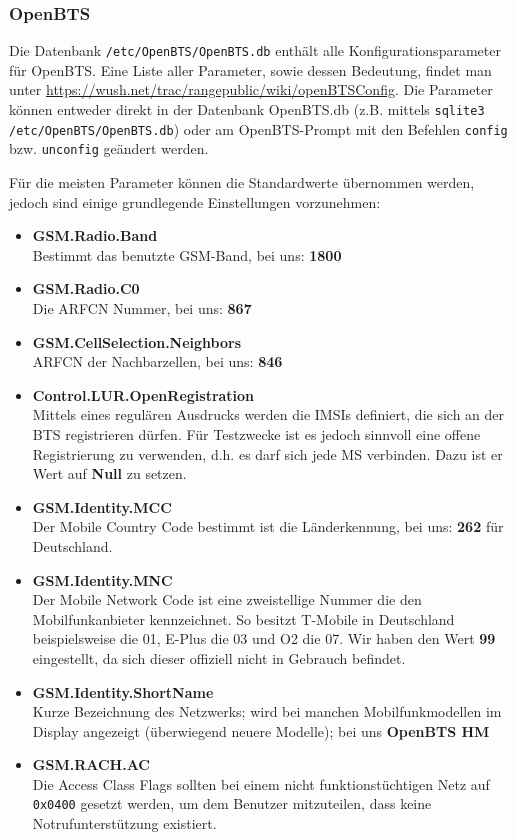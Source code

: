 \subsubsection{OpenBTS}
Die Datenbank \verb|/etc/OpenBTS/OpenBTS.db| enthält alle Konfigurationsparameter für OpenBTS. Eine Liste aller Parameter, sowie dessen Bedeutung, findet man unter \url{https://wush.net/trac/rangepublic/wiki/openBTSConfig}.
Die Parameter können entweder direkt in der Datenbank OpenBTS.db (z.B. mittels \verb|sqlite3 /etc/OpenBTS/OpenBTS.db|) oder am OpenBTS-Prompt mit den Befehlen \verb|config| bzw. \verb|unconfig| geändert werden.

Für die meisten Parameter können die Standardwerte übernommen werden, jedoch sind einige grundlegende Einstellungen vorzunehmen:

\begin{itemize}
  \item \textbf{GSM.Radio.Band}\\
  Bestimmt das benutzte GSM-Band, bei uns: \textbf{1800}
  \item \textbf{GSM.Radio.C0}\\
  Die ARFCN Nummer, bei uns: \textbf{867}
  \item \textbf{GSM.CellSelection.Neighbors}\\
  ARFCN der Nachbarzellen, bei uns: \textbf{846}
  \item \textbf{Control.LUR.OpenRegistration}\\
  Mittels eines regulären Ausdrucks werden die IMSIs definiert, die sich an der BTS registrieren dürfen. Für Testzwecke ist es jedoch sinnvoll eine offene Registrierung zu verwenden, d.h. es darf sich jede MS verbinden. Dazu ist er Wert auf \textbf{Null} zu setzen.
  \item \textbf{GSM.Identity.MCC}\\
  Der Mobile Country Code bestimmt ist die Länderkennung, bei uns: \textbf{262} für Deutschland.
  \item \textbf{GSM.Identity.MNC}\\
  Der Mobile Network Code ist eine zweistellige Nummer die den Mobilfunkanbieter kennzeichnet. So besitzt T-Mobile in Deutschland beispielsweise die 01, E-Plus die 03 und O2 die 07. Wir haben den Wert \textbf{99} eingestellt, da sich dieser offiziell nicht in Gebrauch befindet.
  \item \textbf{GSM.Identity.ShortName}\\
  Kurze Bezeichnung des Netzwerks; wird bei manchen Mobilfunkmodellen im Display angezeigt (überwiegend neuere Modelle); bei uns \textbf{OpenBTS HM}
  \item \textbf{GSM.RACH.AC}\\
  Die Access Class Flags sollten bei einem nicht funktionstüchtigen Netz auf \verb|0x0400| gesetzt werden, um dem Benutzer mitzuteilen, dass keine Notrufunterstützung existiert.    
\end{itemize} 

